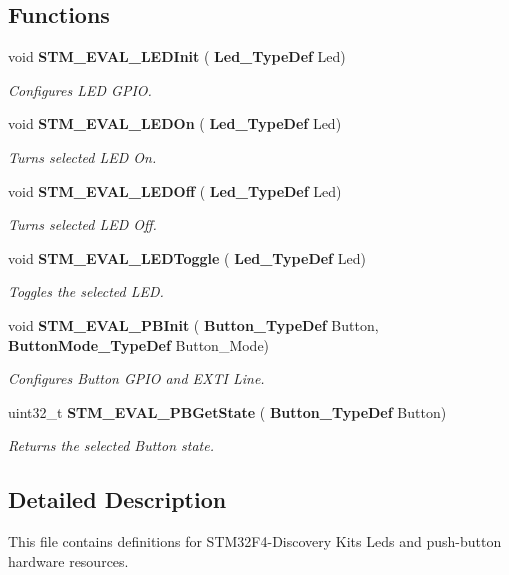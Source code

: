 \subsection*{Functions}
\begin{DoxyCompactItemize}
\item 
void \textbf{ S\+T\+M\+\_\+\+E\+V\+A\+L\+\_\+\+L\+E\+D\+Init} (\textbf{ Led\+\_\+\+Type\+Def} Led)
\begin{DoxyCompactList}\small\item\em Configures L\+ED G\+P\+IO. \end{DoxyCompactList}\item 
void \textbf{ S\+T\+M\+\_\+\+E\+V\+A\+L\+\_\+\+L\+E\+D\+On} (\textbf{ Led\+\_\+\+Type\+Def} Led)
\begin{DoxyCompactList}\small\item\em Turns selected L\+ED On. \end{DoxyCompactList}\item 
void \textbf{ S\+T\+M\+\_\+\+E\+V\+A\+L\+\_\+\+L\+E\+D\+Off} (\textbf{ Led\+\_\+\+Type\+Def} Led)
\begin{DoxyCompactList}\small\item\em Turns selected L\+ED Off. \end{DoxyCompactList}\item 
void \textbf{ S\+T\+M\+\_\+\+E\+V\+A\+L\+\_\+\+L\+E\+D\+Toggle} (\textbf{ Led\+\_\+\+Type\+Def} Led)
\begin{DoxyCompactList}\small\item\em Toggles the selected L\+ED. \end{DoxyCompactList}\item 
void \textbf{ S\+T\+M\+\_\+\+E\+V\+A\+L\+\_\+\+P\+B\+Init} (\textbf{ Button\+\_\+\+Type\+Def} Button, \textbf{ Button\+Mode\+\_\+\+Type\+Def} Button\+\_\+\+Mode)
\begin{DoxyCompactList}\small\item\em Configures Button G\+P\+IO and E\+X\+TI Line. \end{DoxyCompactList}\item 
uint32\+\_\+t \textbf{ S\+T\+M\+\_\+\+E\+V\+A\+L\+\_\+\+P\+B\+Get\+State} (\textbf{ Button\+\_\+\+Type\+Def} Button)
\begin{DoxyCompactList}\small\item\em Returns the selected Button state. \end{DoxyCompactList}\end{DoxyCompactItemize}


\subsection{Detailed Description}
This file contains definitions for S\+T\+M32\+F4-\/\+Discovery Kit\textquotesingle{}s Leds and push-\/button hardware resources. 


